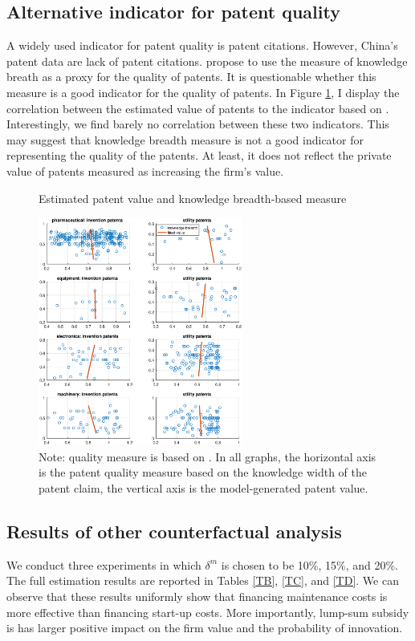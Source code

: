 \documentclass[11pt]{article}
\begin{document}
\subsection{Alternative indicator for patent quality}\label{pat_app}
A widely used indicator for patent quality is patent citations. However, China's patent data are lack of patent citations. \citet{Dang2015} propose to use the measure of knowledge breath as a proxy for the quality of patents. It is questionable whether this measure is a good indicator for the quality of patents. In Figure \ref{F5}, I display the correlation between the estimated value of patents to the indicator based on \citet{Dang2015}. Interestingly, we find barely no correlation between these two indicators. This may suggest that knowledge breadth measure is not a good indicator for representing the quality of the patents. At least, it does not reflect the private value of patents measured as increasing the firm's value.

    \begin{figure}[ht]
    \caption{Estimated patent value and knowledge breadth-based measure}
    \label{F5}
    \begin{centering}
    \includegraphics[width=0.6\textwidth]{Figs/patcorr.eps}
    \par\end{centering}
    \caption*{\small{}Note: quality measure is based on \citet{Dang2015}. In all graphs, the horizontal axis is the patent quality measure based on the knowledge width of the patent claim, the vertical axis is the model-generated patent value.}{\small \par}
    \end{figure}
\subsection{Results of other counterfactual analysis} \label{app_counter}
We conduct three experiments in which $\delta^m$ is chosen to be 10\%, 15\%, and 20\%. The full estimation results are reported in Tables \ref{TB}, \ref{TC}, and \ref{TD}. We can observe that these results uniformly show that financing maintenance costs is more effective than financing start-up costs. More importantly, lump-sum subsidy is has larger positive impact on the firm value and the probability of innovation. 
\end{document}
